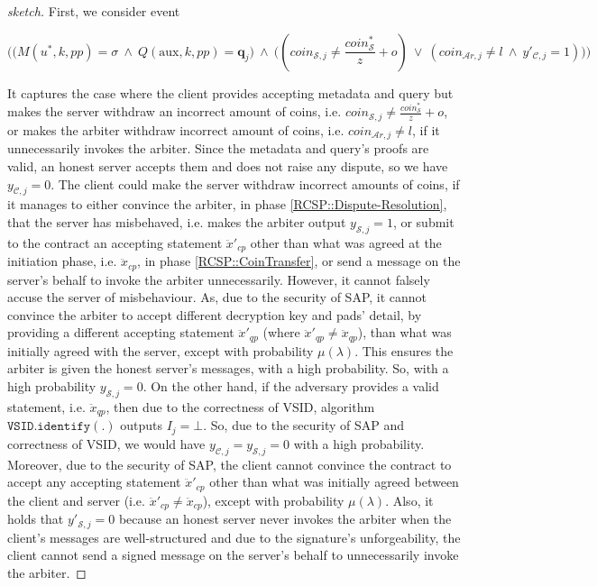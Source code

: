 \begin{proof}[sketch] First, we consider event 
  
   $$\Bigg(\Big(M(u^{\scriptscriptstyle *},k,{pp})= \sigma \  \wedge \ Q(\text{aux},k, {pp})= \bm{q}_{\scriptscriptstyle j}\Big)\ \wedge \
  \Big((coin_{\scriptscriptstyle\mathcal{S},j}\neq  \frac{coin_{\scriptscriptstyle\mathcal S}^{\scriptscriptstyle*}}{z}+o)\ \vee \ (coin_{\scriptscriptstyle\mathcal{A}r,j}\neq l\ \wedge\  y'_{\scriptscriptstyle \mathcal {C},j}=1)\Big)\Bigg)$$
  
  
  It captures the case where the client provides  accepting metadata and query  but makes the server withdraw an incorrect amount of coins, i.e. $coin_{\scriptscriptstyle\mathcal{S},j}\neq  \frac{coin_{\scriptscriptstyle\mathcal S}^{\scriptscriptstyle*}}{z}+o$, or makes the arbiter withdraw incorrect amount of coins, i.e. $coin_{\scriptscriptstyle\mathcal{A}r,j}\neq l$, if it unnecessarily invokes the arbiter.  Since the metadata and query's proofs are valid, an honest server accepts them and does not raise any dispute, so we have $y_{\scriptscriptstyle\mathcal{C},j}=0$.  The client could  make the server  withdraw incorrect amounts of coins, if it manages to either convince the arbiter, in phase \ref{RCSP::Dispute-Resolution}, that the server has misbehaved, i.e. makes the arbiter output $y_{\scriptscriptstyle\mathcal{S},j}=1$, or submit to the contract  an accepting  statement $\ddot{x}'_{\scriptscriptstyle cp}$ other than what was agreed at the initiation phase, i.e. $\ddot{x}_{\scriptscriptstyle cp}$, in phase \ref{RCSP::CoinTransfer}, or send a message on the server's behalf to invoke the arbiter unnecessarily. However, it cannot falsely accuse the server of misbehaviour. As,  due to the security of SAP, it cannot  convince the arbiter to accept different decryption key and pads' detail, by providing a different accepting statement $\ddot{x}'_{\scriptscriptstyle qp}$  (where $\ddot{x}'_{\scriptscriptstyle qp}\neq \ddot{x}_{\scriptscriptstyle qp}$), than what was initially agreed with the server, except with  probability $\mu(\lambda)$. This ensures   the arbiter is given the honest server's messages, with a high probability. So, with a high probability $y_{\scriptscriptstyle\mathcal{S},j}=0$. On the other hand, if the adversary provides a valid statement, i.e. $\ddot{x}_{\scriptscriptstyle qp}$, then due to the correctness of VSID, algorithm $\mathtt{VSID.identify}(.)$ outputs $I_{\scriptscriptstyle j}=\bot$. So, due to the security of SAP and correctness of VSID,  we would have $y_{\scriptscriptstyle\mathcal{C},j}=y_{\scriptscriptstyle\mathcal{S},j}=0$ with a high probability. Moreover, due to the security of SAP, the client cannot convince the contract to accept any accepting statement $\ddot{x}'_{\scriptscriptstyle cp}$ other than what was initially agreed  between the client and server (i.e. $\ddot{x}'_{\scriptscriptstyle cp}\neq \ddot{x}_{\scriptscriptstyle cp}$), except with   probability $\mu(\lambda)$. Also, it holds that  $y'_{\scriptscriptstyle\mathcal{S},j}=0$ because an honest server never invokes the arbiter when the client's messages are well-structured and due to  the signature's unforgeability, the client cannot send a signed message on the server's behalf to unnecessarily invoke the arbiter.  
\end{proof}

